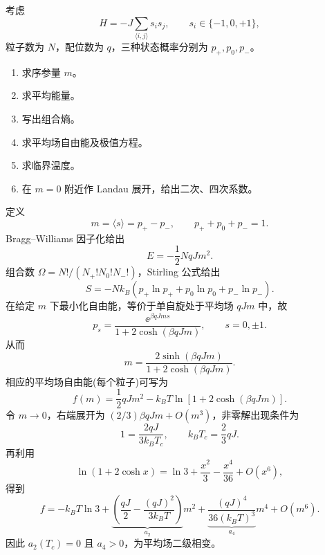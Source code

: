 \begin{question}[25 分]
考虑
\[H=-J\sum_{\langle i,j\rangle}s_is_j,\qquad s_i\in\{-1,0,+1\},\]
粒子数为 $N$，配位数为 $q$，三种状态概率分别为 $p_+,p_0,p_-$。
\begin{enumerate}
  \item 求序参量 $m$。
  \item 求平均能量。
  \item 写出组合熵。
  \item 求平均场自由能及极值方程。
  \item 求临界温度。
  \item 在 $m=0$ 附近作 Landau 展开，给出二次、四次系数。
\end{enumerate}
\begin{solution}
定义
\[m=\langle s\rangle=p_+-p_-,\qquad p_++p_0+p_-=1.\]
Bragg--Williams 因子化给出
\[\boxed{E=-\frac12NqJm^2}.\]
组合数 $\Omega=N!/(N_+!N_0!N_-!)$，Stirling 公式给出
\[\boxed{S=-Nk_B(p_+\ln p_++p_0\ln p_0+p_-\ln p_-)}.\]
在给定 $m$ 下最小化自由能，等价于单自旋处于平均场 $qJm$ 中，故
\[p_s=\frac{\ee^{\beta qJms}}{1+2\cosh(\beta qJm)},\qquad s=0,\pm1.\]
从而
\[\boxed{m=\frac{2\sinh(\beta qJm)}{1+2\cosh(\beta qJm)}}.\]
相应的平均场自由能(每个粒子)可写为
\[f(m)=\frac12qJm^2-k_BT\ln\!\left[1+2\cosh(\beta qJm)\right].\]
令 $m\to0$，右端展开为 $(2/3)\beta qJm+O(m^3)$，非零解出现条件为
\[1=\frac{2qJ}{3k_BT_c},\qquad \boxed{k_BT_c=\frac{2}{3}qJ}.\]
再利用
\[\ln(1+2\cosh x)=\ln3+\frac{x^2}{3}-\frac{x^4}{36}+O(x^6),\]
得到
\[f=-k_BT\ln3+\underbrace{\left(\frac{qJ}{2}-\frac{(qJ)^2}{3k_BT}\right)}_{a_2}m^2+\underbrace{\frac{(qJ)^4}{36(k_BT)^3}}_{a_4}m^4+O(m^6).\]
因此 $a_2(T_c)=0$ 且 $a_4>0$，为平均场二级相变。
\end{solution}
\end{question}

